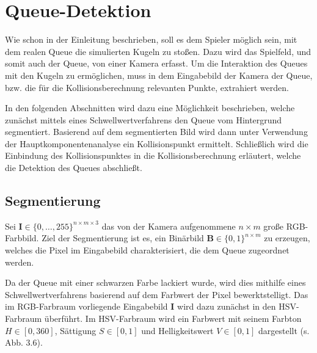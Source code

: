 \section{Queue-Detektion}

Wie schon in der Einleitung beschrieben, soll es dem Spieler möglich sein, mit dem realen Queue die simulierten Kugeln zu stoßen.
Dazu wird das Spielfeld, und somit auch der Queue, von einer Kamera erfasst. 
Um die Interaktion des Queues mit den Kugeln zu ermöglichen, muss in dem Eingabebild der Kamera der Queue, bzw. die für die Kollisionsberechnung relevanten Punkte, extrahiert werden.

In den folgenden Abschnitten wird dazu eine Möglichkeit beschrieben, welche zunächst mittels eines Schwellwertverfahrens den Queue vom Hintergrund segmentiert.
Basierend auf dem segmentierten Bild wird dann unter Verwendung der Hauptkomponentenanalyse ein Kollisionspunkt ermittelt.
Schließlich wird die Einbindung des Kollisionspunktes in die Kollisionsberechnung erläutert, welche die Detektion des Queues abschließt.

\subsection{Segmentierung}
Sei $\textbf{I} \in \{0, \dots, 255\}^{n \times m \times 3}$ das von der Kamera aufgenommene $n \times m$ große RGB-Farbbild.
Ziel der Segmentierung ist es, ein Binärbild $\textbf{B} \in \{0,1\}^{n \times m}$ zu erzeugen, welches die Pixel im Eingabebild charakterisiert, die dem Queue zugeordnet werden.

Da der Queue mit einer schwarzen Farbe lackiert wurde, wird dies mithilfe eines Schwellwertverfahrens basierend auf dem Farbwert der Pixel bewerktstelligt.
Das im RGB-Farbraum vorliegende Eingabebild $\textbf{I}$ wird dazu zunächst in den HSV-Farbraum überführt. 
Im HSV-Farbraum wird ein Farbwert mit seinem Farbton $H \in [0, 360]$, Sättigung $S \in [0, 1]$ und Helligkeitswert $V \in [0, 1]$ dargestellt (s. Abb. 3.6).

